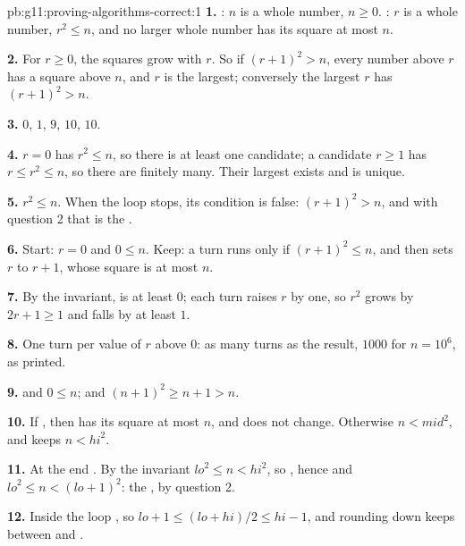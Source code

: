 \begin{solution}{pb:g11:proving-algorithms-correct:1}
\textbf{1.} : $n$ is a whole number, $n \ge 0$. : $r$ is a whole number, $r^2 \le n$, and no
larger whole number has its square at most $n$.

\textbf{2.} For $r \ge 0$, the squares grow with $r$. So if $(r + 1)^2 > n$, every number above $r$ has a square
above $n$, and $r$ is the largest; conversely the largest $r$ has $(r + 1)^2 > n$.

\textbf{3.} $0$, $1$, $9$, $10$, $10$.

\textbf{4.} $r = 0$ has $r^2 \le n$, so there is at least one candidate; a candidate $r \ge 1$ has $r \le r^2 \le n$,
so there are finitely many. Their largest exists and is unique.

\textbf{5.} $r^2 \le n$. When the loop stops, its condition is false: $(r + 1)^2 > n$, and with question 2 that is the
.

\textbf{6.} Start: $r = 0$ and $0 \le n$. Keep: a turn runs only if $(r + 1)^2 \le n$, and then sets $r$ to $r + 1$,
whose square is at most $n$.

\textbf{7.} By the invariant,  is at least $0$; each turn raises $r$ by one, so $r^2$ grows by
$2r + 1 \ge 1$ and  falls by at least $1$.

\textbf{8.} One turn per value of $r$ above $0$: as many turns as the result, $1000$ for $n = 10^6$, as printed.

\textbf{9.}  and $0 \le n$;  and $(n + 1)^2 \ge n + 1 > n$.

\textbf{10.} If , then  has its square at most $n$, and  does not change.
Otherwise $n < \mathit{mid}^2$, and  keeps $n < \mathit{hi}^2$.

\textbf{11.} At the end . By the invariant $\mathit{lo}^2 \le n < \mathit{hi}^2$, so ,
hence  and $\mathit{lo}^2 \le n < (\mathit{lo} + 1)^2$: the , by question 2.

\textbf{12.} Inside the loop , so $\mathit{lo} + 1 \le (\mathit{lo} + \mathit{hi}) / 2 \le
\mathit{hi} - 1$, and rounding down keeps  between  and .


\end{solution}
